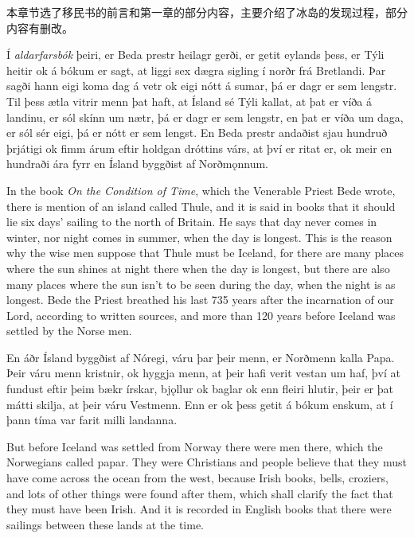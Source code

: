 本章节选了移民书的前言和第一章的部分内容，主要介绍了冰岛的发现过程，部分内容有删改。
\begin{paracol}{2}
    Í \textit{aldarfarsbók} þeiri, er Beda prestr heilagr gerði\footnotemark, er getit eylands þess, er Týli heitir ok á bókum er sagt, at liggi sex dægra sigling í norðr frá Bretlandi. Þar sagði hann eigi koma dag á vetr ok eigi nótt á sumar, þá er dagr er sem lengstr. Til þess ætla vitrir menn þat haft, at Ísland sé Týli kallat, at þat er víða á landinu, er sól skínn um nætr, þá er dagr er sem lengstr, en þat er víða um daga, er sól sér eigi, þá er nótt er sem lengst. En Beda prestr andaðist sjau hundruð þrjátigi ok fimm árum eftir holdgan dróttins várs, at því er ritat er, ok meir en hundraði ára fyrr en Ísland byggðist af Norðmǫnnum.
    \switchcolumn

    In the book \textit{On the Condition of Time}, which the Venerable Priest Bede wrote, there is mention of an island called Thule, and it is said in books that it should lie six days' sailing to the north of Britain. He says that day never comes in winter, nor night comes in summer, when the day is longest. This is the reason why the wise men suppose that Thule must be Iceland, for there are many places where the sun shines at night there when the day is longest, but there are also many places where the sun isn't to be seen during the day, when the night is as longest. Bede the Priest breathed his last 735 years after the incarnation of our Lord, according to written sources, and more than 120 years before Iceland was settled by the Norse men.
    \switchcolumn*

    En áðr Ísland byggðist af Nóregi, váru þar þeir menn, er Norðmenn kalla Papa. Þeir váru menn kristnir, ok hyggja menn, at þeir hafi verit vestan um haf, því at fundust eftir þeim bækr írskar, bjǫllur ok baglar ok enn fleiri hlutir, þeir er þat mátti skilja, at þeir váru Vestmenn. Enn er ok þess getit á bókum enskum, at í þann tíma var farit milli landanna.
    \switchcolumn

    But before Iceland was settled from Norway there were men there, which the Norwegians called papar. They were Christians and people believe that they must have come across the ocean from the west, because Irish books, bells, croziers, and lots of other things were found after them, which shall clarify the fact that they must have been Irish. And it is recorded in English books that there were sailings between these lands at the time.
\end{paracol}
